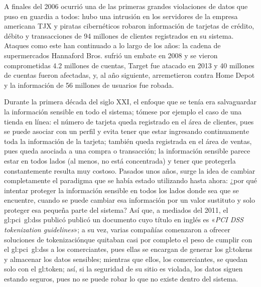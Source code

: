 A finales del 2006 ocurrió una de las primeras grandes violaciones de datos
que puso en guardia a todos: hubo una intrusión en los servidores de la empresa
americana TJX y piratas cibernéticos robaron información de tarjetas de crédito,
débito y transacciones de 94 millones de clientes registrados en su sistema.
Ataques como este han continuado a lo largo de los años: la cadena
de supermercados Hannaford Bros. sufrió un embate en 2008 y se vieron
comprometidas 4.2 millones de cuentas, Target fue atacado en 2013 y 40 millones
de cuentas fueron afectadas, y, al año siguiente, arremetieron contra Home Depot
y la información de 56 millones de usuarios fue robada.

Durante la primera década del siglo XXI, el enfoque que se tenía era
salvaguardar la información sensible en todo el sistema; tómese por ejemplo el
caso de una tienda en línea: el número de tarjeta queda registrado
en el área de clientes, pues se puede asociar con un perfil y evita tener que
estar ingresando continuamente toda la información de la tarjeta; también queda
registrada en el área de ventas, pues queda asociada a una compra o transacción;
la información sensible parece estar en todos lados (al menos, no está
concentrada) y tener que protegerla constantemente resulta muy costoso. Pasados
unos años, surge la idea de cambiar completamente el paradigma que se había
estado utilizando hasta ahora: ¿por qué intentar proteger la información
sensible en todos los lados donde sea que se encuentre, cuando se puede cambiar
esa información por un valor sustituto y solo proteger esa pequeña parte del
sistema? Así que, a mediados del 2011, el \gls{gl:pci}~\gls{gl:dss} publicó
publicó un documento cuyo título en inglés es «\textit{PCI DSS tokenization
guidelines}»; a su vez, varias compañías comenzaron a ofrecer soluciones de
tokenización\footnotemark que quitaban casi por completo el peso de cumplir con
el \gls{gl:pci}~\gls{gl:dss} a los comerciantes, pues ellas se encargan de
generar los \glspl{gl:token} y almacenar los datos sensibles; mientras que
ellos, los comerciantes, se quedan solo con el \gls{gl:token}; así, si la
seguridad de su sitio es violada, los datos siguen estando seguros, pues no se
puede robar lo que no existe dentro del sistema.


